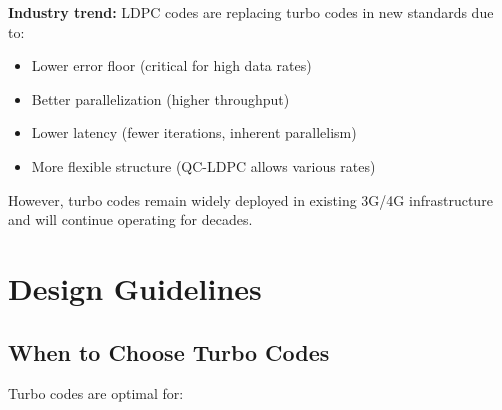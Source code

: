\textbf{Industry trend:} LDPC codes are replacing turbo codes in new standards due to:
\begin{itemize}
\item Lower error floor (critical for high data rates)
\item Better parallelization (higher throughput)
\item Lower latency (fewer iterations, inherent parallelism)
\item More flexible structure (QC-LDPC allows various rates)
\end{itemize}

However, turbo codes remain widely deployed in existing 3G/4G infrastructure and will continue operating for decades.

\section{Design Guidelines}

\subsection{When to Choose Turbo Codes}

Turbo codes are optimal for:

